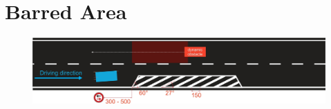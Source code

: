 \section{Barred Area}
\label{fig_barred_area}
\begin{figure}[H]
	\begin{center}
		\centering\includegraphics[width=\textwidth]{graphics/Abb_8_barred_area.jpg}
	\end{center}
\end{figure}

